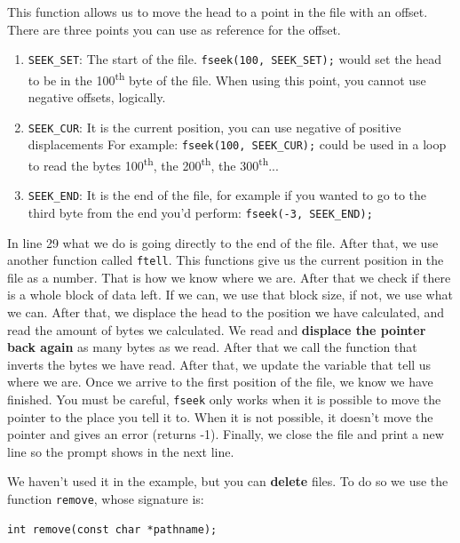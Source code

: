 \documentclass[a4paper]{article}
\begin{document}
This function allows us to move the head to a point in the file with an offset.
There are three points you can use as reference for the offset.
\begin{enumerate}
\item \verb!SEEK_SET!: The start of the file.
\verb!fseek(100, SEEK_SET);! would set the head to be in the
100\textsuperscript{th} byte of the file. When using this point, you cannot use
negative offsets, logically.
\item \verb!SEEK_CUR!: It is the current position, you can use negative of
positive displacements For example: \verb!fseek(100, SEEK_CUR);! could be used
in a loop to read the bytes 100\textsuperscript{th},
the 200\textsuperscript{th}, the 300\textsuperscript{th}...
\item \verb!SEEK_END!: It is the end of the file, for example if you wanted to
go to the third byte from the end you'd perform: \verb!fseek(-3, SEEK_END);!
\end{enumerate}

In line 29 what we do is going directly to the end of the file. After that,
we use another function called \verb!ftell!. This functions give us the current
position in the file as a number. That is how we know where we are. After that
we check if there is a whole block of data left. If we can, we use that block
size, if not, we use what we can. After that, we displace the head to the
position we have calculated, and read the amount of bytes we calculated. We read
and \textbf{displace the pointer back again} as many bytes as we read. After
that we call the function that inverts the bytes we have read. After that,
we update the variable that tell us where we are. Once we arrive to the first
position of the file, we know we have finished. You must be careful,
\verb!fseek! only works when it is possible to move the pointer to the place you
tell it to. When it is not possible, it doesn't move the pointer and gives an
error (returns -1). Finally, we close the file and print a new line so the
prompt shows in the next line.

We haven't used it in the example, but you can \textbf{delete} files. To do so
we use the function \verb!remove!, whose signature is:

\noindent
\begin{minipage}[H]{\linewidth}
\mbox{}
\begin{lstlisting}[style=C,
caption={\texttt{remove} function signature},
label={lst:signatureRemove}]
int remove(const char *pathname);
\end{lstlisting}
\end{minipage}
\end{document}
